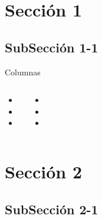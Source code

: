 \documentclass{beamer}
\begin{document}
\section{Sección 1}

\subsection{SubSección 1-1}

\begin{frame}{Columnas}{}
  \begin{columns}
      \begin{itemize}
        \item
        \item
        \item
      \end{itemize}
      \begin{itemize}
        \item
        \item
        \item
      \end{itemize}
  \end{columns}
\end{frame}

\section{Sección 2}

\subsection{SubSección 2-1}
\end{document}
